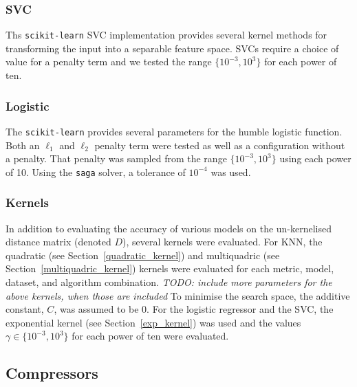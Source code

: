\documentclass[preprint,12pt]{elsarticle}
\newcommand{\cm}[1]{\textit{{\color{blue}#1}}}
\begin{document}
\subsubsection{SVC}

Ths \texttt{scikit-learn} SVC implementation provides several kernel methods for transforming the input into a separable feature space. 
SVCs require a choice of value for a penalty term and we tested the range $\{ 10^{-3}, 10^3 \}$ for each power of ten. 



\subsubsection{Logistic}

The \texttt{scikit-learn} provides several parameters for the humble logistic function. 
Both an $\ell_1$ and $\ell_2$ penalty term were tested as well as a configuration without a penalty. That penalty was sampled from the range $\{10^{-3}, 10^3\}$ using each power of 10. 
Using the \texttt{saga} solver, a tolerance of $10^{-4}$ was used.

\subsubsection{Kernels}

In addition to evaluating the accuracy of various models on the un-kernelised distance matrix (denoted $D$), several kernels were evaluated.
For KNN, the quadratic (see Section~\ref{quadratic_kernel}) and multiquadric (see Section~\ref{multiquadric_kernel}) kernels were evaluated for each metric, model, dataset, and algorithm combination. 
\cm{TODO: include more parameters for the above kernels, when those are included}
To minimise the search space, the additive constant, $C$, was assumed to be 0. 
For the logistic regressor and the SVC, the exponential kernel (see Section~\ref{exp_kernel}) was used and the values $\gamma \in \{10^{-3}, 10^3\}$ for each power of ten were evaluated.



\subsection{Compressors}
\label{compressors}
\end{document}

